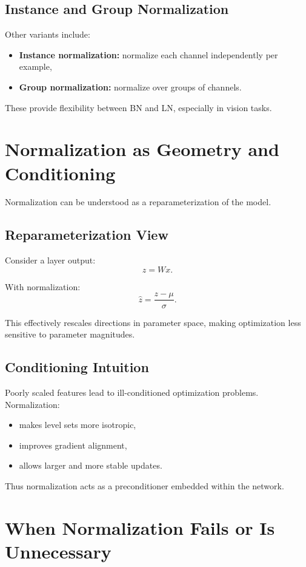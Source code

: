 \subsection{Instance and Group Normalization}

Other variants include:
\begin{itemize}
    \item \textbf{Instance normalization:} normalize each channel independently per example,
    \item \textbf{Group normalization:} normalize over groups of channels.
\end{itemize}

These provide flexibility between BN and LN, especially in vision tasks.

\section{Normalization as Geometry and Conditioning}

Normalization can be understood as a reparameterization of the model.

\subsection{Reparameterization View}

Consider a layer output:
\[
z = W x.
\]

With normalization:
\[
\hat{z} = \frac{z - \mu}{\sigma}.
\]

This effectively rescales directions in parameter space, making optimization less sensitive to parameter magnitudes.

\subsection{Conditioning Intuition}

Poorly scaled features lead to ill-conditioned optimization problems. Normalization:
\begin{itemize}
    \item makes level sets more isotropic,
    \item improves gradient alignment,
    \item allows larger and more stable updates.
\end{itemize}

Thus normalization acts as a preconditioner embedded within the network.

\section{When Normalization Fails or Is Unnecessary}

